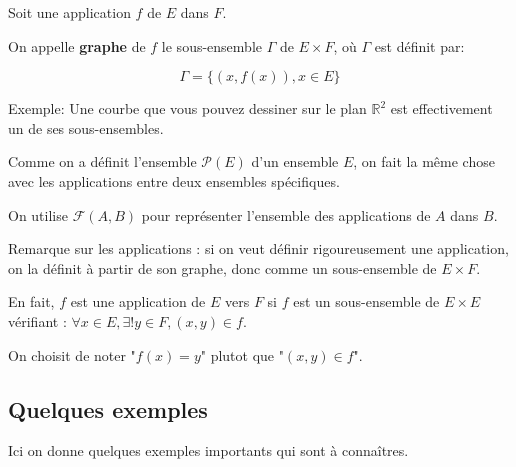 \documentclass{article}
\begin{document}
 \begin{tcolorbox}[colback=red!5!white,colframe=red!75!black,title=Définition 3.2]

Soit une application $f$ de $E$ dans $F$.

On appelle \textbf{graphe} de $f$ le sous-ensemble $\Gamma$ de $E \times F$, où $\Gamma$ est définit par: 

\[
\Gamma = \{(x, f(x)), x \in E\}
\]
\end{tcolorbox}

Exemple: Une courbe que vous pouvez dessiner sur le plan $\mathbb{R}^{2}$ est effectivement un de ses sous-ensembles.

Comme on a définit l'ensemble $\mathcal{P}(E)$ d'un ensemble $E$, on fait la même chose avec les applications entre deux ensembles spécifiques.

\begin{tcolorbox}[colback=yellow!5!white,colframe=yellow!75!black,title=Notation 3.2]

On utilise $\mathcal{F}(A,B)$ pour représenter l'ensemble des applications de $A$ dans $B$.


\end{tcolorbox}


\begin{tcolorbox}[colback=purple!5!white,colframe=purple!75!black,title=Remarque importante]

Remarque sur les applications : si on veut définir rigoureusement une application, on la définit à partir de son graphe, donc comme un sous-ensemble de $E \times F$. 

En fait, $f$ est une application de $E$ vers $F$ si $f$ est un sous-ensemble de $E \times E$ vérifiant :
$\forall x \in E, \exists ! y \in F, (x,y) \in f$.

On choisit de noter "$f(x)=y$" plutot que "$(x,y) \in f$".


\end{tcolorbox}


\subsection{Quelques exemples}

Ici on donne quelques exemples importants qui sont à connaîtres.
\end{document}

